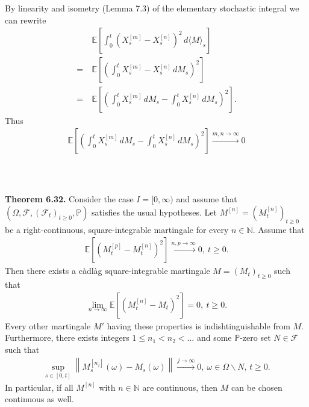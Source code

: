 \documentclass{beamer}
\numberwithin{equation}{section}
\newenvironment{frame2}{\begin{frame}\frametitle{{\normalsize \secname} \\ {\large \subsecname}}}{\end{frame}}
\begin{document}
\begin{frame2}
    By linearity and isometry (Lemma 7.3) of the elementary stochastic integral we can rewrite
    \begin{align*}
        &\mathbb{E}\left[\int_0^t (X_s^{[m]} - X^{[n]}_s)^2 \, d\langle M \rangle_s\right] \\
        =\ &\mathbb{E}\left[\left(\int_0^t X_s^{[m]} - X^{[n]}_s \, dM_s\right)^2\right] \\
        =\ &\mathbb{E}\left[\left(\int_0^t X_s^{[m]}\, dM_s - \int_0^tX^{[n]}_s \, dM_s\right)^2\right].
    \end{align*}
    Thus 
    \begin{align}
        \mathbb{E}\left[\left(\int_0^t X_s^{[m]}\, dM_s - \int_0^tX^{[n]}_s \, dM_s\right)^2\right] \xrightarrow{m,n\to\infty}0
    \end{align}
\end{frame2}

\begin{frame2}
    \begingroup
    \footnotesize
    \textbf{Theorem 6.32.}
    Consider the case $I = [0,\infty)$ and assume that $(\Omega, \mathcal{F}, (\mathcal{F}_t)_{t \geq 0},\mathbb{P})$ satisfies the usual hypotheses.
    Let $M^{[n]} = (M_t^{[n]})_{t\geq 0}$ be a right-continuous, square-integrable martingale for every $n \in \mathbb{N}$.
    Assume that
    \begin{align}
        \mathbb{E}\left[(M_t^{[p]} - M_t^{[n]})^2\right] \xrightarrow{n, p \to\infty} 0, \ t \geq 0.
    \end{align}
    Then there exists a càdlàg square-integrable martingale $M = \left(M_t\right)_{t \geq 0}$ such that
    \begin{align}
        \lim_{n \to \infty} \mathbb{E}\left[(M_t^{[n]} - M_t)^2\right] = 0, \ t \geq 0.
    \end{align}
    Every other martingale $M'$ having these properties is indishtinguishable from $M$.
    Furthermore, there exists integers $ 1 \leq n_1 < n_2 < \ldots$ and some $\mathbb{P}$-zero set $N\in \mathcal{F}$ such that
    \begin{align}
        \sup_{s \in [0,t]} \left\|M_s^{[n_j]}(\omega) - M_s(\omega) \right\| \xrightarrow{j \to \infty} 0, \ \omega \in \Omega\backslash N, \, t \geq 0.
    \end{align}
    In particular, if all $M^{[n]}$ with $n \in \mathbb{N}$ are continuous, then $M$ can be chosen continuous as well.
    \endgroup
\end{frame2}
\end{document}
